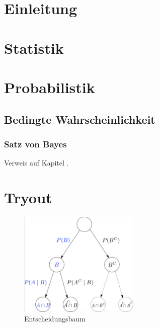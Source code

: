 \documentclass{article}
\begin{document}
\setcounter{page}{1}		%

\section{Einleitung}\label{sec:intro}
\lipsum[1]

\newpage
\section{Statistik}\label{sec:stat}
\lipsum[1]

\newpage
\section{Probabilistik}
\subsection{Bedingte Wahrscheinlichkeit}

\subsubsection{Satz von Bayes}
Verweis auf Kapitel \pageref{sec:stat}.



\newpage
\section{Tryout}\label{sec:tryout}

\begin{figure}[H]	%
	\centering
	\includegraphics[height=5cm]{figures/tryout.png}
	\caption[Optional optional]{Entscheidungsbaum}
	\label{fig:tryout}
\end{figure}
\end{document}
